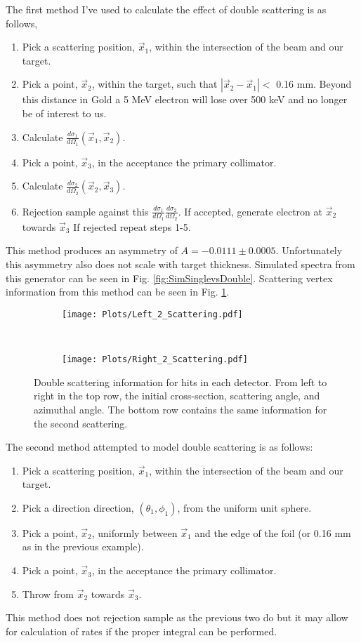 \documentclass[11pt]{article}
\begin{document}
The first method I've used to calculate the effect of double scattering is as follows,
\begin{enumerate}
 \item Pick a scattering position, $\vec{x}_1$, within the intersection of the beam and our target.
 \item Pick a point, $\vec{x}_2$, within the target, such that $|\vec{x}_2-\vec{x}_1| <$ 0.16 mm. Beyond this distance in Gold a 5 MeV electron will lose over 500 keV and no longer be of interest to us.    
 \item Calculate $\frac{d\sigma_1}{d\Omega_1}(\vec{x}_1,\vec{x}_2)$.
 \item Pick a point, $\vec{x}_3$, in the acceptance the primary collimator.
 \item Calculate $\frac{d\sigma_2}{d\Omega_2}(\vec{x}_2,\vec{x}_3)$.
 \item Rejection sample against this $\frac{d\sigma_1}{d\Omega_1}\frac{d\sigma_2}{d\Omega_2}$. If accepted, generate electron at $\vec{x}_2$ towards $\vec{x}_3$  If rejected repeat steps 1-5.
\end{enumerate}
This method produces an asymmetry of $\boxed{A = -0.0111 \pm 0.0005}$. Unfortunately this asymmetry also does not scale with target thickness. Simulated spectra from this generator can be seen in Fig. \ref{fig:SimSinglevsDouble}. Scattering vertex information from this method can be seen in Fig. \ref{fig:DoubleScattering}.

\begin{figure}[!h]
\begin{subfigure}{\textwidth}
 \texttt{[image: Plots/Left\_2\_Scattering.pdf]}
\end{subfigure}\\
\begin{subfigure}{\textwidth}
 \texttt{[image: Plots/Right\_2\_Scattering.pdf]}
\end{subfigure}
 \caption{Double scattering information for hits in each detector. From left to right in the top row, the initial cross-section, scattering angle, and azimuthal angle. The bottom row contains the same information for the second scattering.}
\label{fig:DoubleScattering}
\end{figure}

The second method attempted to model double scattering is as follows:
\begin{enumerate}
 \item Pick a scattering position, $\vec{x}_1$, within the intersection of the beam and our target.
 \item Pick a direction direction, $(\theta_1,\phi_1)$, from the uniform unit sphere.
 \item Pick a point, $\vec{x}_2$, uniformly between $\vec{x}_1$ and the edge of the foil (or 0.16 mm as in the previous example).
 \item Pick a point, $\vec{x}_3$, in the acceptance the primary collimator.
 \item Throw from $\vec{x}_2$ towards $\vec{x}_3$.
\end{enumerate}
This method does not rejection sample as the previous two do but it may allow for calculation of rates if the proper integral can be performed. 
\end{document}
